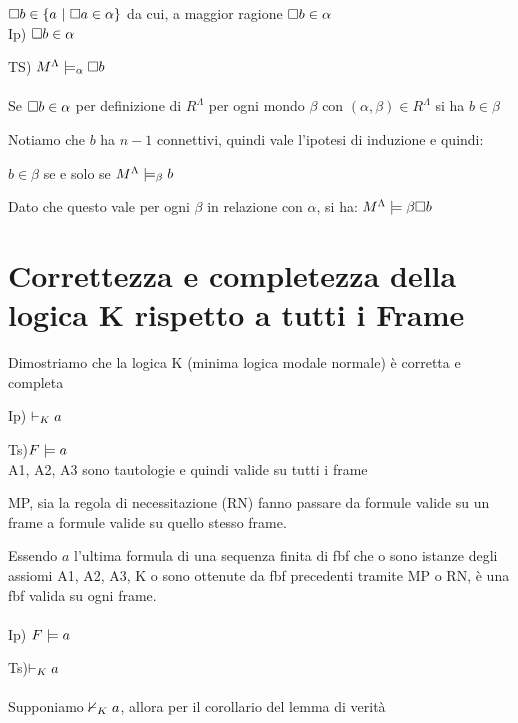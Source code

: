 $\square b\in\{a\ |\ \square a\in\alpha\}$ da cui, a maggior ragione $\square b\in\alpha$\\


Ip) $\square b\in\alpha$

TS) $M^{\Lambda}\models_{\alpha}\square b$\\
\\
 Se $\square b\in\alpha$ per definizione di $R^{\Lambda}$ per ogni
mondo $\beta$ con $(\alpha,\beta)\in R^{\Lambda}$ si ha $b\in\beta$

Notiamo che $b$ ha $n-1$ connettivi, quindi vale l'ipotesi di induzione
e quindi:

$ $$b\in\beta$ se e solo se $M^{\Lambda}\models_{\beta}b$

Dato che questo vale $ $per ogni $\beta$ in relazione con $\alpha$,
si ha: $M^{\Lambda}\models\beta\square b$


\section{Correttezza e completezza della logica K rispetto a tutti i Frame}

Dimostriamo che la logica K (minima logica modale normale) è corretta
e completa

Ip) $\vdash_{K}a$

Ts)$F\models a$\\


A1, A2, A3 sono tautologie e quindi valide su tutti i frame

MP, sia la regola di necessitazione (RN) fanno passare da formule
valide su un frame a formule valide su quello stesso frame.

Essendo $a$ l’ultima formula di una sequenza finita di fbf che o
sono istanze degli assiomi A1, A2, A3, K o sono ottenute da fbf precedenti
tramite MP o RN, è una fbf valida su ogni frame.\\
 \\
 Ip) $F\models a$

Ts)$\vdash_{K}a$ \\
 \\
 Supponiamo $\nvdash_{K}a$, allora per il corollario del lemma di
verità\\


 \\


